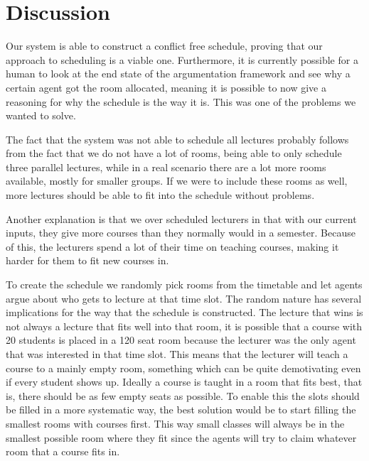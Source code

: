 \section{Discussion}
Our system is able to construct a conflict free schedule, proving that our
approach to scheduling is a viable one. Furthermore, it is currently
possible for a human to look at the end state of the argumentation
framework and see why a certain agent got the room allocated, meaning it is
possible to now give a reasoning for why the schedule is the way it is.
This was one of the problems we wanted to solve.

The fact that the system was not able to schedule all lectures probably
follows from the fact that we do not have a lot of rooms, being able to
only schedule three parallel lectures, while in a real scenario there are a
lot more rooms available, mostly for smaller groups. If we were to include
these rooms as well, more lectures should be able to fit into the schedule
without problems.

Another explanation is that we over scheduled lecturers in that with our
current inputs, they give more courses than they normally would in a
semester. Because of this, the lecturers spend a lot of their time on
teaching courses, making it harder for them to fit new courses in. 

To create the schedule we randomly pick rooms from the timetable and let agents
argue about who gets to lecture at that time slot. The random nature has several
implications for the way that the schedule is constructed. The lecture that wins
is not always a lecture that fits well into that room, it is possible that a
course with 20 students is placed in a 120 seat room because the lecturer was
the only agent that was interested in that time slot. This means that the
lecturer will teach a course to a mainly empty room, something which can be
quite demotivating even if every student shows up. Ideally a course is taught in
a room that fits best, that is, there should be as few empty seats as possible.
To enable this the slots should be filled in a more systematic way, the best
solution would be to start filling the smallest rooms with courses first. This
way small classes will always be in the smallest possible room where they fit
since the agents will try to claim whatever room that a course fits in.

